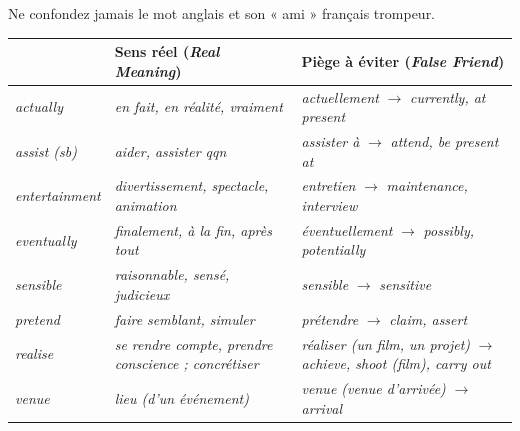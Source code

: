 \documentclass[11pt]{article}
\newcommand{\eng}[1]{\ifmmode\text{\textit{#1}}\else\begingroup\selectlanguage{english}\itshape #1\endgroup\fi}
\providecommand{\fr}[1]{\textit{#1}}
\begin{document}
\begin{attention}
\noindent Ne confondez jamais le mot anglais et son « ami » français trompeur.
\begin{center}
\begin{tabularx}{\linewidth}{|X|X|X|}
\hline
\rowcolor{poporangeL} \textbf{Mot anglais (\eng{English})} & \textbf{Sens réel (\fr{Real Meaning})} & \textbf{Piège à éviter (\fr{False Friend})} \\
\hline
\eng{actually} & \fr{en fait, en réalité, vraiment} & \fr{actuellement} $\rightarrow$ \eng{currently, at present} \\
\eng{assist (sb)} & \fr{aider, assister qqn} & \fr{assister à} $\rightarrow$ \eng{attend, be present at} \\
\eng{entertainment} & \fr{divertissement, spectacle, animation} & \fr{entretien} $\rightarrow$ \eng{maintenance, interview} \\
\eng{eventually} & \fr{finalement, à la fin, après tout} & \fr{éventuellement} $\rightarrow$ \eng{possibly, potentially} \\
\eng{sensible} & \fr{raisonnable, sensé, judicieux} & \fr{sensible} $\rightarrow$ \eng{sensitive} \\
\eng{pretend} & \fr{faire semblant, simuler} & \fr{prétendre} $\rightarrow$ \eng{claim, assert} \\
\eng{realise} & \fr{se rendre compte, prendre conscience ; concrétiser} & \fr{réaliser (un film, un projet)} $\rightarrow$ \eng{achieve, shoot (film), carry out} \\
\eng{venue} & \fr{lieu (d'un événement)} & \fr{venue (venue d'arrivée)} $\rightarrow$ \eng{arrival} \\
\hline
\end{tabularx}
\end{center}
\end{attention}
\end{document}
